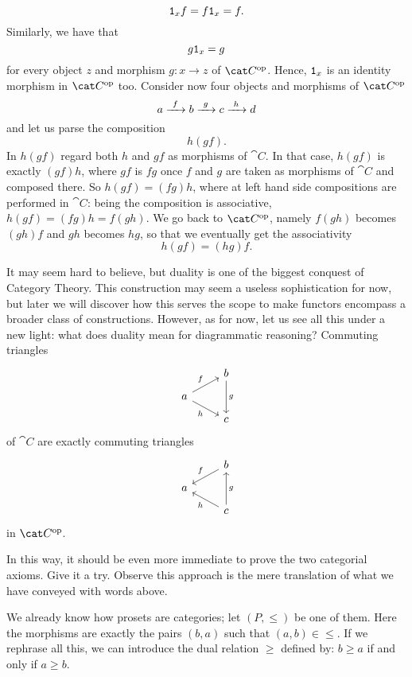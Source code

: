 \[\mathtt 1_x f = f \mathtt 1_x = f .\]
Similarly, we have that
\[g \mathtt 1_x  = g\]
for every object \(z\) and morphism \(g : x \to z\) of \(\op{\cat C}\). Hence, \(\mathtt 1_x\) is an identity morphism in \(\op{\cat C}\) too. Consider now four objects and morphisms of \(\op{\cat C}\)
\[a \xrightarrow{\ f\ } b \xrightarrow{\ g\ } c \xrightarrow{\ h\ } d\]
and let us parse the composition
\[h(gf) .\]
In \(h(gf)\) regard both \(h\) and \(gf\) as morphisms of \(\cat C\). In that case, \(h(gf)\) is exactly \((gf)h\), where \(gf\) is \(fg\) once \(f\) and \(g\) are taken as morphisms of \(\cat C\) and composed there. So \(h(gf) = (fg)h\), where at left hand side compositions are performed in \(\cat C\): being the composition is associative, \(h(gf) = (fg)h = f(gh)\). We go back to \(\op{\cat C}\), namely \(f(gh)\) becomes \((gh)f\) and \(gh\) becomes \(hg\), so that we eventually get the associativity
\[h(gf) = (hg) f .\]

It may seem hard to believe, but duality is one of the biggest conquest of Category Theory.  This construction may seem a useless sophistication for now, but later we will discover how this serves the scope to make functors encompass a broader class of constructions. However, as for now, let us see all this under a new light: what does duality mean for diagrammatic reasoning? Commuting triangles
\[\begin{tikzcd}[row sep=small]
& b \ar["g", dd] \\
a \ar["f", ur] \ar["h", dr, swap] \\
& c
\end{tikzcd}\]
of \(\cat C\) are exactly commuting triangles
\[\begin{tikzcd}[row sep=small]
& b \ar["f", dl, swap] \\
a \\
& c \ar["h", ul] \ar["g", uu, swap]
\end{tikzcd}\]
in \(\opcat C\).

\begin{exercise}
In this way, it should be even more immediate to prove the two categorial axioms. Give it a try. Observe this approach is the mere translation of what we have conveyed with words above.
\end{exercise}

\begin{example}
We already know how prosets are categories; let \((P, \leqslant)\) be one of them. Here the morphisms are exactly the pairs \((b, a)\) such that \((a, b) \in \leqslant\). If we rephrase all this, we can introduce the dual relation \(\geqslant\) defined by: \(b \geqslant a\) if and only if \(a \geqslant b\).
\end{example}

